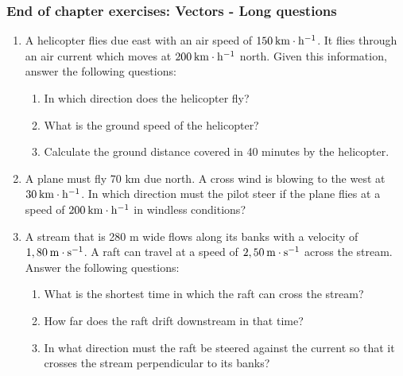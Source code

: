             \subsubsection{ End of chapter exercises: Vectors - Long questions}
            \nopagebreak
        \label{m38819*id198154}\begin{enumerate}[noitemsep, label=\textbf{\arabic*}. ] 
            \label{m38819*uid118}\item A helicopter flies due east with an air speed of $150\phantom{\rule{2pt}{0ex}}\mathrm{km}\ensuremath{\cdot}\mathrm{h}{}^{-1}$. It flies through an air current which moves at $200\phantom{\rule{2pt}{0ex}}\mathrm{km}\ensuremath{\cdot}\mathrm{h}{}^{-1}$ north. Given this information, answer the following questions:
\label{m38819*id198203}\begin{enumerate}[noitemsep, label=\textbf{\alph*}. ] 
            \label{m38819*uid119}\item In which direction does the helicopter fly?
\label{m38819*uid120}\item What is the ground speed of the helicopter?
\label{m38819*uid121}\item Calculate the ground distance covered in 40 minutes by the helicopter.
\end{enumerate}
                \label{m38819*uid122}\item A plane must fly 70 km due north. A cross wind is blowing to the west at $30\phantom{\rule{2pt}{0ex}}\mathrm{km}\ensuremath{\cdot}\mathrm{h}{}^{-1}$. In which direction must the pilot steer if the plane flies at a speed of $200\phantom{\rule{2pt}{0ex}}\mathrm{km}\ensuremath{\cdot}\mathrm{h}{}^{-1}$ in windless conditions?\newline
\label{m38819*uid123}\item A stream that is 280 m wide flows along its banks with a velocity of $1,80\phantom{\rule{2pt}{0ex}}\mathrm{m}\ensuremath{\cdot}\mathrm{s}{}^{-1}$. A raft can travel at a speed of $2,50\phantom{\rule{2pt}{0ex}}\mathrm{m}\ensuremath{\cdot}\mathrm{s}{}^{-1}$ across the stream. Answer the following questions:
\label{m38819*id198337}\begin{enumerate}[noitemsep, label=\textbf{\alph*}. ] 
            \label{m38819*uid124}\item What is the shortest time in which the raft can cross the stream?
\label{m38819*uid125}\item How far does the raft drift downstream in that time?
\label{m38819*uid126}\item In what direction must the raft be steered against the current so that it crosses the stream perpendicular to its banks?

\end{enumerate}
\end{enumerate}
